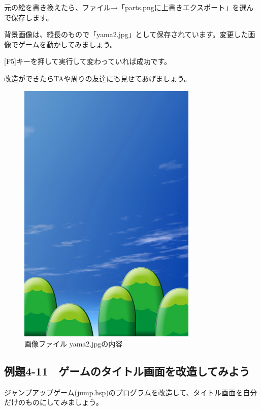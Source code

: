 元の絵を書き換えたら、ファイル→「parts.pngに上書きエクスポート」を選んで保存します。
\clearpage


背景画像は、縦長のもので「yama2.jpg」として保存されています。変更した画像でゲームを動かしてみましょう。

[F5]キーを押して実行して変わっていれば成功です。

改造ができたらTAや周りの友達にも見せてあげましょう。


\begin{figure}[H]
    \begin{center}
      \includegraphics[keepaspectratio,width=8.546cm,height=12.804cm]{text04-img/s_yama2.jpg}
      \caption{画像ファイル yama2.jpgの内容}
    \end{center}
    \label{fig:prog_menu}
\end{figure}

\newpage
\subsection{例題4-11　ゲームのタイトル画面を改造してみよう}


\begin{description}
    \item {}
\end{description}


ジャンプアップゲーム(jump.hsp)のプログラムを改造して、タイトル画面を自分だけのものにしてみましょう。

